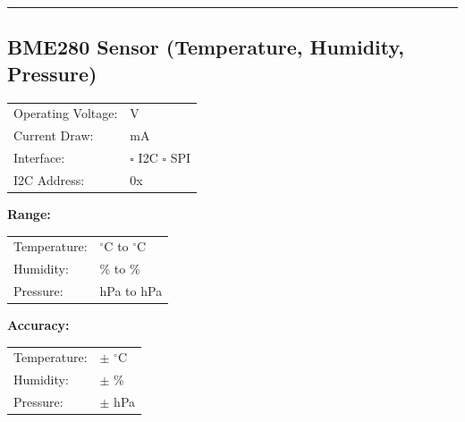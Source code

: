 \documentclass[10pt,letterpaper]{article}
\begin{document}
\vspace{0.5em}
\hrule
\vspace{0.5em}

\subsection*{BME280 Sensor (Temperature, Humidity, Pressure)}
\begin{tabularx}{\textwidth}{lX}
Operating Voltage: & \underline{\hspace{4cm}} V \\
Current Draw: & \underline{\hspace{4cm}} mA \\
Interface: & $\square$ I2C $\square$ SPI \\
I2C Address: & 0x\underline{\hspace{2cm}} \\
\end{tabularx}

\textbf{Range:}
\begin{tabularx}{\textwidth}{lX}
Temperature: & \underline{\hspace{2cm}} $^\circ$C to \underline{\hspace{2cm}} $^\circ$C \\
Humidity: & \underline{\hspace{2cm}} \% to \underline{\hspace{2cm}} \% \\
Pressure: & \underline{\hspace{2cm}} hPa to \underline{\hspace{2cm}} hPa \\
\end{tabularx}

\textbf{Accuracy:}
\begin{tabularx}{\textwidth}{lX}
Temperature: & $\pm$ \underline{\hspace{2cm}} $^\circ$C \\
Humidity: & $\pm$ \underline{\hspace{2cm}} \% \\
Pressure: & $\pm$ \underline{\hspace{2cm}} hPa \\
\end{tabularx}
\end{document}
